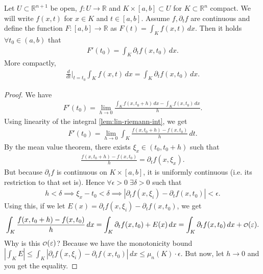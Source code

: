 \begin{theorem}\label{thm:diff-und-int}
	Let $U \subset \mathbb{R}^{n+1}$ be open, $f: U \to \mathbb{R}$ and $K \times [a,b] \subset U$ for $K \subset \mathbb{R}^{n}$ compact. We will write $f(x,t)$ for $x \in K$ and $t \in [a,b]$. Assume $f, \partial_{t}f$ are continuous and define the function $F: [a,b] \to \mathbb{R}$ as $F(t) = \int_{K} f(x,t) \, dx$. Then it holds $\forall t_{0} \in (a,b)$ that
	\begin{align*}
		F'(t_{0})  = \int_{K} \partial_{t}f(x, t_{0}) \, dx.
	\end{align*}
	More compactly,
	\begin{align*}
		\frac{d}{dt} \Big|_{t = t_{0}} \int_{K} f(x,t) \, dx = \int_{K} \partial_{t}f(x, t_{0}) \, dx.
	\end{align*}
\end{theorem}
\begin{proof}
	We have
	\begin{align*}
		F'(t_{0}) = \lim_{h \to 0} \frac{ \int_{K} f(x,t_{0}+h) \, dx - \int_{K} f(x,t_{0}) \, dx }{h}.
	\end{align*}
	Using linearity of the integral \ref{lem:lin-riemann-int}, we get
	\begin{align*}
		F'(t_{0}) = \lim_{h \to 0} \int_{K} \frac{f(x,t_{0}+h) - f(x,t_{0})}{h} \, dt.
	\end{align*}
	By the mean value theorem, there exists $\xi_{x} \in (t_{0}, t_{0}+h)$ such that
	\begin{align*}
		\frac{f(x, t_{0} + h) - f(x, t_{0})}{h} = \partial_{t}f(x, \xi_{x}).
	\end{align*}
	But because $\partial_{t}f$ is continuous on $K \times [a,b]$, it is uniformly continuous (i.e. its restriction to that set is). Hence $\forall \epsilon > 0 \; \exists \delta > 0$ such that
	\begin{align*}
		h < \delta \implies \xi_{x} - t_{0} < \delta \implies \left| \partial_{t}f(x, \xi_{i}) - \partial_{t}f(x,t_{0}) \right| < \epsilon.
	\end{align*}
	Using this, if we let $E(x) = \partial_{t}f(x, \xi_{i}) - \partial_{t}f(x,t_{0}) $, we get
	\begin{align*}
		\int_{K} \frac{f(x, t_{0}+h) - f(x, t_{0})}{h} \, dx = \int_{K} \partial_{t}f(x, t_{0}) + E(x) \, dx = \int_{K} \partial_{t}f(x, t_{0}) \, dx + \smalO(\epsilon).
	\end{align*}
	Why is this $\smalO(\epsilon)$? Because we have the monotonicity bound $\left| \int_{K} E \right| \leq \int_{K} |\partial_{t}f(x, \xi_{i}) - \partial_{t}f(x,t_{0})| \, dx \leq \mu_{n}(K) \cdot \epsilon$. But now, let $h \to 0$ and you get the equality.
\end{proof}

